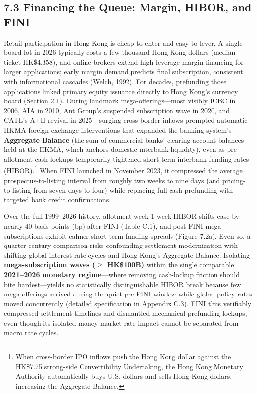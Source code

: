 \documentclass[11pt,letterpaper]{article}
\begin{document}
\subsection*{\texorpdfstring{7.3 Financing the Queue: Margin, HIBOR, and FINI}{7.3 Financing the Queue: Margin, HIBOR, and FINI}}
Retail participation in Hong Kong is cheap to enter and easy to lever. A single board lot in 2026 typically costs a few thousand Hong Kong dollars (median ticket HK\$4,358), and online brokers extend high-leverage margin financing for larger applications; early margin demand predicts final subscription, consistent with informational cascades (Welch, 1992). For decades, prefunding those applications linked primary equity issuance directly to Hong Kong's currency board (Section 2.1). During landmark mega-offerings—most visibly ICBC in 2006, AIA in 2010, Ant Group's suspended subscription wave in 2020, and CATL's A+H revival in 2025—surging cross-border inflows prompted automatic HKMA foreign-exchange interventions that expanded the banking system's \textbf{Aggregate Balance} (the sum of commercial banks' clearing-account balances held at the HKMA, which anchors domestic interbank liquidity), even as pre-allotment cash lockups temporarily tightened short-term interbank funding rates (HIBOR).\footnote{When cross-border IPO inflows push the Hong Kong dollar against the HK\$7.75 strong-side Convertibility Undertaking, the Hong Kong Monetary Authority automatically buys U.S. dollars and sells Hong Kong dollars, increasing the Aggregate Balance.} When FINI launched in November 2023, it compressed the average prospectus-to-listing interval from roughly two weeks to nine days (and pricing-to-listing from seven days to four) while replacing full cash prefunding with targeted bank credit confirmations.

Over the full 1999–2026 history, allotment-week 1-week HIBOR shifts ease by nearly 40 basis points (bp) after FINI (Table C.1), and post-FINI mega-subscriptions exhibit calmer short-term funding spreads (Figure 7.2a). Even so, a quarter-century comparison risks confounding settlement modernization with shifting global interest-rate cycles and Hong Kong's Aggregate Balance. Isolating \textbf{mega-subscription waves ($\ge$ HK\$100B)} within the single comparable \textbf{2021–2026 monetary regime}—where removing cash-lockup friction should bite hardest—yields no statistically distinguishable HIBOR break because few mega-offerings arrived during the quiet pre-FINI window while global policy rates moved concurrently (detailed specification in Appendix C.3). FINI thus verifiably compressed settlement timelines and dismantled mechanical prefunding lockups, even though its isolated money-market rate impact cannot be separated from macro rate cycles.
\end{document}
